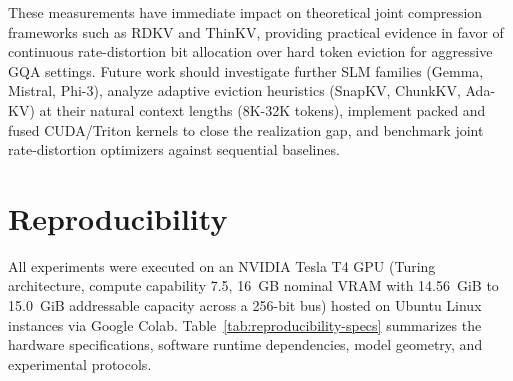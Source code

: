 \documentclass[sigconf,nonacm]{acmart}
\begin{document}
These measurements have immediate impact on theoretical joint compression frameworks such as RDKV and ThinKV, providing practical evidence in favor of continuous rate-distortion bit allocation over hard token eviction for aggressive GQA settings. Future work should investigate further SLM families (Gemma, Mistral, Phi-3), analyze adaptive eviction heuristics (SnapKV, ChunkKV, Ada-KV) at their natural context lengths (8K-32K tokens), implement packed and fused CUDA/Triton kernels to close the realization gap, and benchmark joint rate-distortion optimizers against sequential baselines.


\section{Reproducibility}
\label{sec:reproducibility}

All experiments were executed on an NVIDIA Tesla T4 GPU (Turing architecture, compute capability 7.5, 16~GB nominal VRAM with 14.56~GiB to 15.0~GiB addressable capacity across a 256-bit bus) hosted on Ubuntu Linux instances via Google Colab. Table~\ref{tab:reproducibility-specs} summarizes the hardware specifications, software runtime dependencies, model geometry, and experimental protocols.
\end{document}
